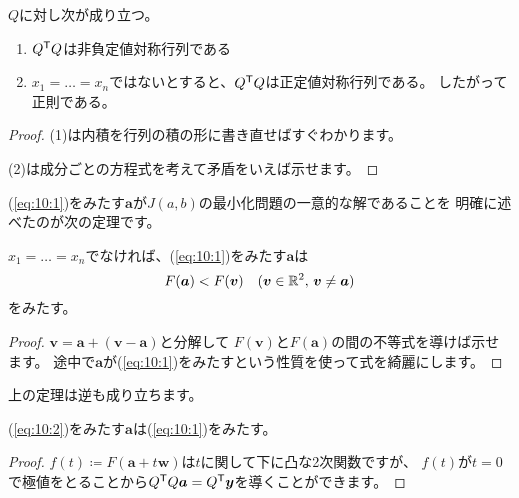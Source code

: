 \documentclass[report]{jlreq}
\begin{document}
    \begin{proposition}
        $Q$に対し次が成り立つ。
        \begin{enumerate}
            \item $Q^{\mathsf{T}} Q$は非負定値対称行列である
            \item $x_1 = \dots = x_n$ではないとすると、$Q^{\mathsf{T}} Q$は正定値対称行列である。
                したがって正則である。
        \end{enumerate}
    \end{proposition}

\begin{proof}
    (1)は内積を行列の積の形に書き直せばすぐわかります。

    (2)は成分ごとの方程式を考えて矛盾をいえば示せます。
\end{proof}

(\ref{eq:10:1})をみたす$\bm{a}$が$J(a, b)$の最小化問題の一意的な解であることを
明確に述べたのが次の定理です。

\begin{theorem}
    $x_1 = \dots = x_n$でなければ、(\ref{eq:10:1})をみたす$\bm{a}$は
    \begin{equation}
        F(\bm{a}) < F(\bm{v}) \quad (\bm{v} \in \mathbb{R}^2,\, \bm{v} \neq \bm{a})
        \label{eq:10:2}
    \end{equation}
    をみたす。
\end{theorem}

\begin{proof}
    $\bm{v} = \bm{a} + (\bm{v} - \bm{a})$と分解して
    $F(\bm{v})$と$F(\bm{a})$の間の不等式を導けば示せます。
    途中で$\bm{a}$が(\ref{eq:10:1})をみたすという性質を使って式を綺麗にします。
\end{proof}

上の定理は逆も成り立ちます。

\begin{theorem}
    (\ref{eq:10:2})をみたす$\bm{a}$は(\ref{eq:10:1})をみたす。
\end{theorem}

\begin{proof}
    $f(t) \coloneqq F(\bm{a} + t\bm{w})$は$t$に関して下に凸な2次関数ですが、
    $f(t)$が$t = 0$で極値をとることから$Q^{\mathsf{T}} Q \bm{a} = Q^{\mathsf{T}} \bm{y}$を導くことができます。
\end{proof}



%
\end{document}
